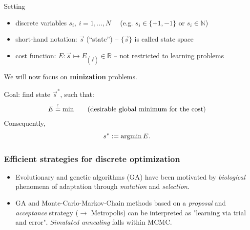 \begin{frame}
\begin{block}{Setting} 
\begin{itemize}
 \item discrete variables $s_i, \ i = 1, \ldots, N\quad$ (e.g. $s_i \in \{+1, -1\}$   or $s_i \in \mathbb N$) 
 \item \indent short-hand notation: $\vec{s}$ (``state'') -- { $\{\vec{s}\}$ is called state space }
 \item {cost function:} $E: \vec{s} \mapsto E_{(\vec{s})} \in \mathbb{R}$ -- { not restricted to learning problems}
\end{itemize}
\end{block}

We will now focus on \textbf{minization} problems.

\begin{block}{Goal: find state $\vec{s}^*$, such that:} 
\begin{equation*}
	E \stackrel{\mathrm{!}}{=} \min \qquad (\text{desirable global minimum for the cost})
\end{equation*}
Consequently,
\begin{equation*}
	s^* := \argmin E.
\end{equation*}
\end{block}
\end{frame}

\begin{frame}
\frametitle{Efficient strategies for discrete optimization}

\begin{itemize}
\item Evolutionary and genetic algorithms (GA) have been
  motivated by \emph{biological} phenomena of adaptation through
  \emph{mutation} and \emph{selection}.
\item GA and Monte-Carlo-Markov-Chain methods based on a \emph{proposal} and
  \emph{acceptance} strategy ($\rightarrow$ Metropolis) can be interpreted
  as "learning via trial and error". \emph{Simulated annealing} falls within MCMC.
\end{itemize}
\end{frame}

